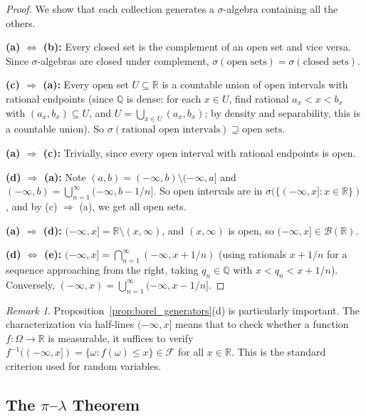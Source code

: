 \documentclass[11pt,a4paper]{article}
\theoremstyle{definition}
\theoremstyle{plain}
\theoremstyle{remark}
\newtheorem{remark}{Remark}[section]
\newcommand{\R}{\mathbb{R}}
\newcommand{\Q}{\mathbb{Q}}
\newcommand{\Borel}{\mathcal{B}}
\begin{document}
\begin{proof}
We show that each collection generates a $\sigma$-algebra containing all the others.

\textbf{(a) $\Leftrightarrow$ (b):} Every closed set is the complement of an open set
and vice versa. Since $\sigma$-algebras are closed under complement,
$\sigma(\text{open sets}) = \sigma(\text{closed sets})$.

\textbf{(c) $\Rightarrow$ (a):} Every open set $U \subseteq \R$ is a countable
union of open intervals with rational endpoints (since $\Q$ is dense: for each
$x \in U$, find rational $a_x < x < b_x$ with $(a_x, b_x) \subseteq U$, and
$U = \bigcup_{x \in U} (a_{x}, b_{x})$; by density and separability, this is a countable union). So $\sigma(\text{rational open intervals}) \supseteq \text{open sets}$.

\textbf{(a) $\Rightarrow$ (c):} Trivially, since every open interval with rational
endpoints is open.

\textbf{(d) $\Rightarrow$ (a):} Note $(a, b) = (-\infty, b) \setminus (-\infty, a]$
and $(-\infty, b) = \bigcup_{n=1}^\infty (-\infty, b - 1/n]$. So open intervals
are in $\sigma(\{(-\infty, x] : x \in \R\})$, and by (c) $\Rightarrow$ (a), we
get all open sets.

\textbf{(a) $\Rightarrow$ (d):} $(-\infty, x] = \R \setminus (x, \infty)$, and
$(x, \infty)$ is open, so $(-\infty, x] \in \Borel(\R)$.

\textbf{(d) $\Leftrightarrow$ (e):} $(-\infty, x] = \bigcap_{n=1}^\infty (-\infty, x + 1/n)$ (using rationals $x + 1/n$ for a sequence approaching from the right, taking $q_n \in \Q$ with $x < q_n < x + 1/n$). Conversely,
$(-\infty, x) = \bigcup_{n=1}^\infty (-\infty, x - 1/n]$.
\end{proof}

\begin{remark}
Proposition~\ref{prop:borel_generators}(d) is particularly important. The
characterization via half-lines $(-\infty, x]$ means that to check whether a
function $f: \Omega \to \R$ is measurable, it suffices to verify
$f^{-1}((-\infty, x]) = \{\omega : f(\omega) \leq x\} \in \mathcal{F}$ for all
$x \in \R$. This is the standard criterion used for random variables.
\end{remark}

\subsection{The $\pi$--$\lambda$ Theorem}
\label{subsec:pi_lambda}
\end{document}
